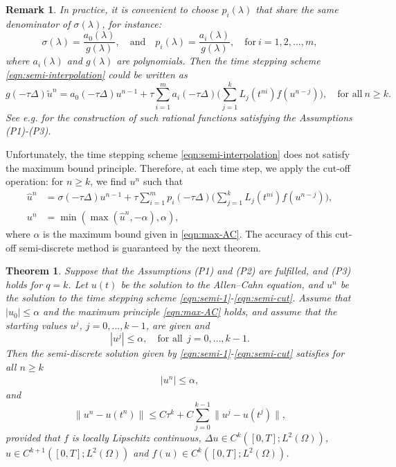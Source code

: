 \documentclass[a4paper, oneside]{book}
\def\II{(\Omega)}
\newtheorem{remark}{Remark}[section]
\newtheorem{theorem}{Theorem}[section]
\begin{document}
\begin{remark}
In practice,
it is convenient to choose $p_i(\lambda)$ that share the same denominator of $\sigma(\lambda)$, for instance:
$$\sigma(\lambda) = \frac{a_0(\lambda)}{g(\lambda)},\quad \text{and} \quad p_i(\lambda) = \frac{a_i(\lambda)}{g(\lambda)},\quad \text{for}~i=1,2,\ldots,m,$$
where $a_i(\lambda)$ and $g(\lambda)$ are polynomials.
Then the time stepping scheme \eqref{eqn:semi-interpolation} could be written as
\begin{equation*}
g(-\tau\Delta)\tilde u^{n} = a_0(-\tau\Delta) u^{n-1} + \tau \sum_{i=1}^m a_i(-\tau \Delta)
\Big(\sum_{j=1}^{k} L_j (t^{ni}) f(u^{n-j})\Big),\quad \text{for all}~n\ge k.
\end{equation*}
See e.g. \cite[pp. 131]{Thomee:2006} for the construction of such rational functions satisfying the Assumptions (P1)-(P3).
\end{remark}


Unfortunately, the time stepping scheme \eqref{eqn:semi-interpolation} does not satisfy the maximum bound principle. Therefore,
at each time step, we apply the cut-off operation: for $n\ge k$, we find $u^n$ such that
\begin{align}
\hat u^{n} &= \sigma(-\tau\Delta) u^{n-1} + \tau \sum_{i=1}^m p_i(-\tau \Delta)
\Big(\sum_{j=1}^{k} L_j (t^{ni}) f(u^{n-j})\Big),\label{eqn:semi-1}\\
u^{n} &=  \min(\max(\hat u^{n},-\alpha),\alpha),\label{eqn:semi-cut}
\end{align}
where $\alpha$ is the maximum bound given in \eqref{eqn:max-AC}.
The accuracy of this cut-off semi-discrete method is guaranteed by the next theorem.


\begin{theorem}\label{thm:semi}
Suppose that the Assumptions (P1) and (P2) are fulfilled, and (P3) holds for $q=k$.
Let $u(t)$ be the solution to the Allen--Cahn equation, and $u^n$ be the solution to the time stepping scheme
\eqref{eqn:semi-1}-\eqref{eqn:semi-cut}.
Assume that $|u_0|\le \alpha$ and the maximum principle \eqref{eqn:max-AC} holds,
and assume that the starting values $u^j$, $j=0,\dots,k-1$, are given and
$$
|u^j|\le \alpha, \quad \text{for all}~~j=0,\dots,k-1.
$$
Then the semi-discrete solution given by  \eqref{eqn:semi-1}-\eqref{eqn:semi-cut} satisfies for all $n\ge k$
\begin{align*}%
|u^n|\le \alpha,
\end{align*}
and
\begin{equation*}%
\|u^n - u(t^n)\|\leq C\tau^k + C\sum_{j=0}^{k-1}\|u^j - u(t^j)\|,
\end{equation*}
provided that  $f$ is locally Lipschitz continuous, $\Delta u\in C^{k}([0,T]; L^2\II)$, $ u\in C^{k+1}([0,T];L^2\II)$ and $f(u) \in C^k([0,T];L^2\II)$.
\end{theorem}
\end{document}

